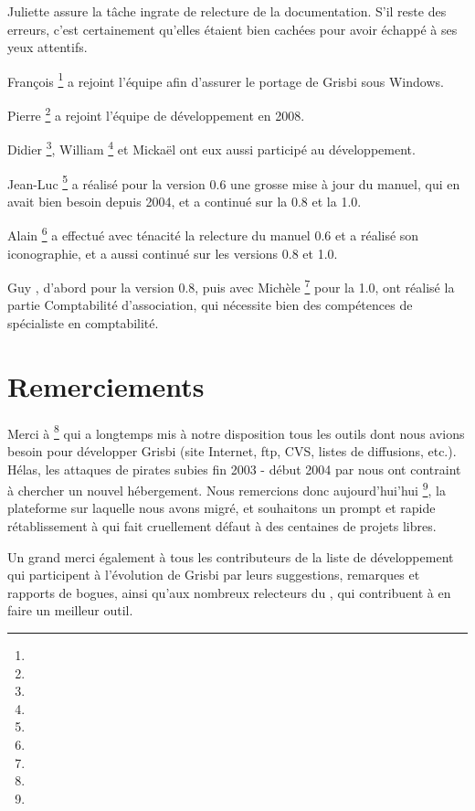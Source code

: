 Juliette  assure la tâche ingrate de relecture de la documentation. S'il reste des erreurs, c'est certainement qu'elles étaient bien cachées pour avoir échappé à ses yeux
attentifs.

François \footnote{\urlFrancoisTerrotEmail{}} a rejoint l'équipe afin d'assurer le \gls{portage} de Grisbi sous Windows.

Pierre \footnote{\urlPierreBiavaEmail{}} a rejoint l'équipe de développement en 2008.

Didier \footnote{\urlDidierChevalierEmail{}}, William \footnote{\urlWilliamOllivierEmail{}} et Mickaël  ont eux aussi participé au développement.

Jean-Luc \footnote{\urlJeanLucDuflotEmail{}} a réalisé pour la version 0.6 une grosse mise à jour du manuel, qui en avait bien besoin depuis 2004, et a continué sur la 0.8 et la 1.0.

Alain \footnote{\urlAlainLetientEmail{}} a effectué avec ténacité la relecture du manuel 0.6 et a réalisé son iconographie, et a aussi continué sur les versions 0.8 et 1.0.

Guy , d'abord pour la version 0.8, puis avec Michèle \footnote{\urlMicheleBondilEmail{}} pour la 1.0, ont réalisé la partie Comptabilité d'association, qui nécessite bien des compétences de spécialiste en comptabilité.


\section{Remerciements\label{introduction-thanks}}


Merci à \footnote{\urlTuxFamily{}} qui a longtemps mis à notre disposition tous les outils dont nous avions besoin pour développer Grisbi
(site Internet, ftp, CVS, listes de diffusions, etc.). Hélas, les attaques
de pirates subies fin 2003 - début 2004 par  nous ont contraint à chercher un nouvel hébergement. Nous remercions donc aujourd'hui'hui \footnote{\urlSourceForge{}}, la plateforme sur laquelle nous avons migré, et souhaitons un prompt et rapide rétablissement à  qui fait cruellement défaut à des centaines de projets libres.

Un grand merci également à tous les contributeurs de la liste de développement qui participent à l'évolution de Grisbi par leurs suggestions, remarques et rapports de bogues, ainsi qu'aux nombreux relecteurs du , qui contribuent à en faire un meilleur outil.


